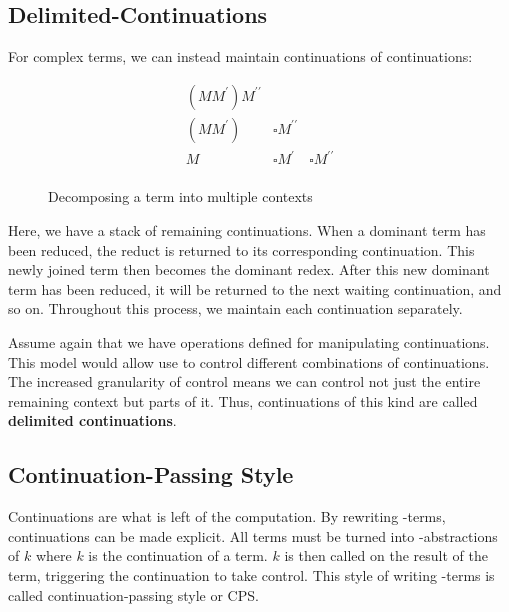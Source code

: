   \subsection{Delimited-Continuations}
 
  For complex terms, we can instead maintain continuations of continuations:
  
  \begin{figure}[!h]
    \[
    \begin{array}{lll}
      (MM^\prime) M^{\prime\prime} \\
      (MM^\prime) & \square M^{\prime\prime} \\
      M & \square M^\prime & \square M^{\prime\prime} \\
    \end{array}
    \]
  \caption{Decomposing a term into multiple contexts}
  \end{figure}

  Here, we have a stack of remaining continuations. When a dominant term
  has been reduced, the reduct is returned to its corresponding continuation. 
  This newly joined term then becomes the dominant redex. After this new 
  dominant term has been reduced, it will be returned to the next waiting 
  continuation, and so on. Throughout this process, we maintain each 
  continuation separately.
  
  Assume again that we have operations defined for manipulating continuations.
  This model would allow use to control different combinations of continuations.
  The increased granularity of control means we can control not just the
  entire remaining context but parts of it. Thus, continuations of this kind
  are called \textbf{delimited continuations}.

  \subsection{Continuation-Passing Style}
 
  Continuations are what is left of the computation. By rewriting 
  \lam-terms, continuations can be made explicit. All terms must
  be turned into \lam-abstractions of $k$ where $k$ is the continuation
  of a term. $k$ is then called on the result of the term, triggering
  the continuation to take control. This style of writing \lam-terms
  is called continuation-passing style or CPS.
  
  
